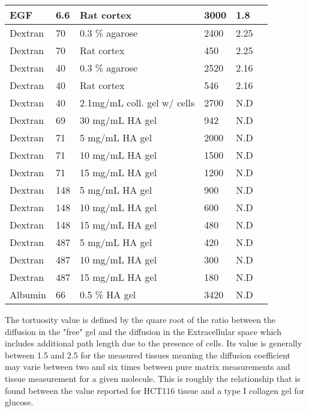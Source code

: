 \documentclass[11pt,a4paper]{article}
\begin{document}
\begin{center}
\begin{tabular}{ |p{18mm}|p{18mm}|p{35mm}|p{25mm}|p{15mm}|p{10mm}| }
 \hline
 EGF & 6.6 & Rat cortex & 3000 & 1.8 & \cite{Thorne2005}\\
 \hline
 Dextran & 70 & 0.3 \% agarose & 2400 & 2.25 & \cite{Nicholson1994}\\ 
 \hline
 Dextran & 70 & Rat cortex & 450  & 2.25 & \cite{Nicholson1994}\\
 \hline
 Dextran & 40 & 0.3 \% agarose & 2520 & 2.16 & \cite{Nicholson1994}\\
 \hline
 Dextran & 40 & Rat cortex & 546 & 2.16 & \cite{Nicholson1994}\\
 \hline
 Dextran & 40 & 2.1mg/mL coll. gel w/ cells & 2700 & N.D & \cite{Kihara2013} \\
 \hline
  Dextran & 69 & 30 mg/mL HA gel & 942 & N.D & \cite{Shenoy1995} \\
 \hline
   Dextran & 71 & 5 mg/mL HA gel & 2000 & N.D & \cite{DeSmedt1994} \\
 \hline
    Dextran & 71 & 10 mg/mL HA gel & 1500 & N.D & \cite{DeSmedt1994} \\
 \hline
   Dextran & 71 & 15 mg/mL HA gel & 1200 & N.D & \cite{DeSmedt1994} \\
 \hline
   Dextran & 148 & 5 mg/mL HA gel & 900 & N.D & \cite{DeSmedt1994} \\
 \hline
    Dextran & 148 & 10 mg/mL HA gel & 600 & N.D & \cite{DeSmedt1994} \\
 \hline
   Dextran & 148 & 15 mg/mL HA gel & 480 & N.D & \cite{DeSmedt1994} \\
 \hline
    Dextran & 487 & 5 mg/mL HA gel & 420 & N.D & \cite{DeSmedt1994} \\
 \hline
    Dextran & 487 & 10 mg/mL HA gel & 300 & N.D & \cite{DeSmedt1994} \\
 \hline
   Dextran & 487 & 15 mg/mL HA gel & 180 & N.D & \cite{DeSmedt1994} \\
 \hline
   Albumin & 66 & 0.5 \% HA gel & 3420 & N.D & \cite{Winlove1984} \\
 \hline
\end{tabular}
\end{center}

The tortuosity value is defined by the quare root of the ratio between the diffusion in the "free" gel and the diffusion in the Extracellular space which includes additional path length due to the presence of cells.\cite{Nicholson1994} Its value is generally between 1.5 and 2.5 for the measured tissues meaning the diffusion coefficient may varie between two and six times between pure matrix measurements and tissue measurement for a given molecule. This is roughly the relationship that is found between the value reported for HCT116 tissue and a type I collagen gel for glucose.
\end{document}
